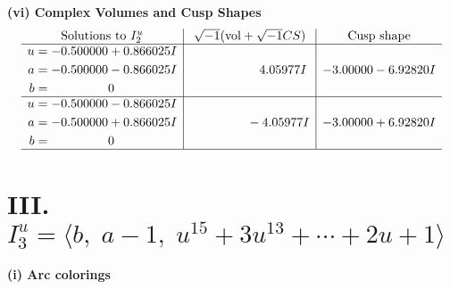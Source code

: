 \documentclass[1p]{elsarticle_modified}
\theoremstyle{definition}
\newcommand{\I}{\sqrt{-1}}
\begin{document}
\newpage\flushleft \textbf{(vi) Complex Volumes and Cusp Shapes}
$$\begin{array}{c|c|c}  
\text{Solutions to }I^u_{2}& \I (\text{vol} + \sqrt{-1}CS) & \text{Cusp shape}\\
 \hline 
\begin{aligned}
u &= -0.500000 + 0.866025 I \\
a &= -0.500000 - 0.866025 I \\
b &= \phantom{-0.000000 } 0\end{aligned}
 & \phantom{-0.000000 -}4.05977 I & -3.00000 - 6.92820 I \\ \hline\begin{aligned}
u &= -0.500000 - 0.866025 I \\
a &= -0.500000 + 0.866025 I \\
b &= \phantom{-0.000000 } 0\end{aligned}
 & \phantom{-0.000000 } -4.05977 I & -3.00000 + 6.92820 I\\
 \hline 
 \end{array}$$\newpage\newpage\renewcommand{\arraystretch}{1}
\centering \section*{III. $I^u_{3}= \langle b,\;a-1,\;u^{15}+3 u^{13}+\cdots+2 u+1 \rangle$}
\flushleft \textbf{(i) Arc colorings}\\
\end{document}
